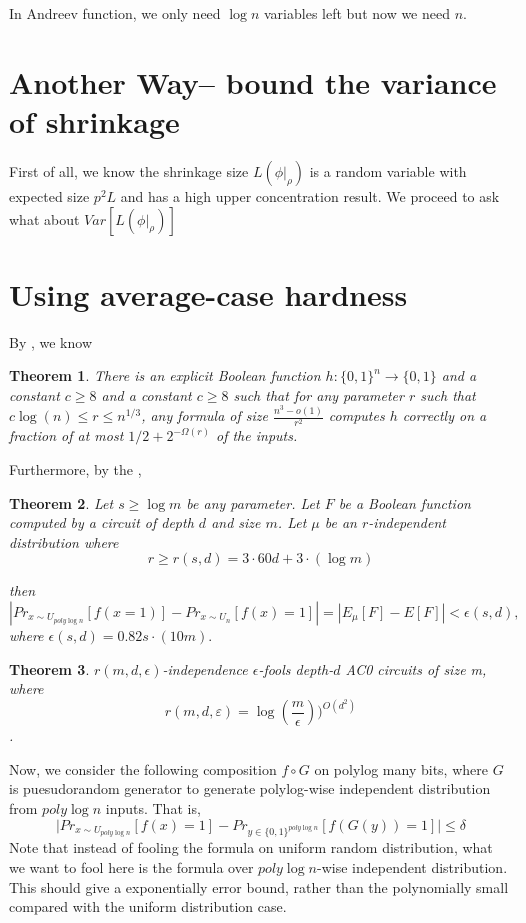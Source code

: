\documentclass[12pt]{article}
\newtheorem{theorem}{Theorem}[section]
\renewcommand{\.}{,\ldots,}
\begin{document}
In Andreev function, we only need $\log n$ variables left but now we need $n$. 


\section{Another Way-- bound the variance of shrinkage}
First of all, we know the shrinkage size $L(\phi|_{\rho})$ is a random variable with expected size $p^2L$ and has a high upper concentration result. We proceed to ask what about $Var[L(\phi|_\rho)]$

\section{Using average-case hardness }
By \cite{komargodski2013improved}, we know 
\begin{theorem}
There is an explicit Boolean function $h:\{0,1\}^n\rightarrow \{0,1\}$ and a constant $c\geq 8$ and a constant $c\geq 8$ such that for  any parameter $r$ such that $c\log(n)\leq r\le n^{1/3}$, any formula of size $\frac{n^3-o(1)}{r^2}$ computes $h$ correctly on a fraction of at most $1/2+2^{-\Omega(r)}$ of the inputs. 
\end{theorem}

Furthermore, by the \cite{braverman2010polylogarithmic},
\begin{theorem}
Let $s \ge \log m$ be any parameter. Let $F$ be a Boolean function
computed by a circuit of depth $d$ and size $m$. Let $\mu$ be an $r$-independent distribution
where
$$r \geq  r(s, d) = 3 \cdot 60d+3 \cdot (\log m)$$

then
$$|Pr_{x\sim U_{poly\log n}}[f(x=1)]-Pr_{x\sim U_n}[f(x)=1]|=|E_\mu[F] -E[F]| < \epsilon(s, d),$$
where $\epsilon(s, d) = 0.82s \cdot(10m).$
\end{theorem}
\begin{theorem}
$r(m, d,\epsilon)$-independence $\epsilon$-fools depth-$d$ AC0 circuits of size
m, where
$$r(m, d, ε)=\log(\frac{m}{\epsilon}))^{O(d^2)}$$. 
\end{theorem}

Now, we consider the following composition $f\circ G$ on polylog many bits, where $G$ is puesudorandom generator to generate polylog-wise independent distribution from $poly\log n$ inputs. That is, 
$$\big|Pr_{x\sim U_{poly\log n}}[f(x)=1]-Pr_{y\in\{0,1\}^{poly\log n}}[f(G(y))=1]\big|\leq \delta$$
Note that instead of fooling the formula on uniform random distribution, what we want to fool here is the formula over $poly\log n$-wise independent distribution. This should give a exponentially error bound, rather than the polynomially small compared with the uniform distribution case. 
\end{document}
